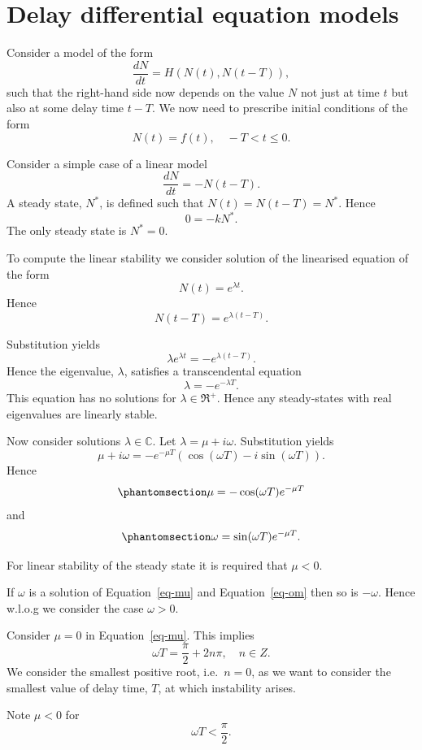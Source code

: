 \documentclass[
  letterpaper,
  DIV=11,
  numbers=noendperiod]{scrreprt}
\begin{document}
\section{Delay differential equation
models}\label{delay-differential-equation-models}

Consider a model of the form \[
\frac{dN}{dt}=H(N(t),N(t-T)),
\] such that the right-hand side now depends on the value \(N\) not just
at time \(t\) but also at some delay time \(t-T\). We now need to
prescribe initial conditions of the form \[
N(t)=f(t), \quad -T<t\leq0.
\]

Consider a simple case of a linear model \[
\frac{dN}{dt}=-N(t-T).
\] A steady state, \(N^*\), is defined such that \(N(t)=N(t-T)=N^*\).
Hence \[
0=-kN^*.
\] The only steady state is \(N^*=0\).

To compute the linear stability we consider solution of the linearised
equation of the form \[
N(t)=e^{\lambda t}.
\] Hence \[
N(t-T)=e^{\lambda (t-T)}.
\]

Substitution yields \[
\lambda  e^{\lambda t} = - e^{\lambda (t-T)}.
\] Hence the eigenvalue, \(\lambda\), satisfies a transcendental
equation \[
\lambda=-e^{-\lambda T}.
\] This equation has no solutions for \(\lambda \in \Re^+\). Hence any
steady-states with real eigenvalues are linearly stable.

Now consider solutions \(\lambda \in \mathbb{C}\). Let
\(\lambda=\mu+i\omega\). Substitution yields \[
\mu+i\omega = -e^{-\mu T}(\cos(\omega T)-i \sin(\omega T)).
\] Hence \begin{equation}\protect\phantomsection\label{eq-mu}{
\mu=-\cos(\omega T)e^{-\mu T} 
}\end{equation} and
\begin{equation}\protect\phantomsection\label{eq-om}{
\omega = \sin(\omega T)e^{-\mu T}.
}\end{equation}

For linear stability of the steady state it is required that \(\mu <0\).

If \(\omega\) is a solution of Equation~\ref{eq-mu} and
Equation~\ref{eq-om} then so is \(-\omega\). Hence w.l.o.g we consider
the case \(\omega>0\).

Consider \(\mu=0\) in Equation~\ref{eq-mu}. This implies \[
\omega T=\frac{\pi}{2} + 2n\pi, \quad n \in Z.
\] We consider the smallest positive root, i.e.~\(n=0\), as we want to
consider the smallest value of delay time, \(T\), at which instability
arises.

Note \(\mu<0\) for \[
\omega T< \frac{\pi}{2}.
\]
\end{document}
